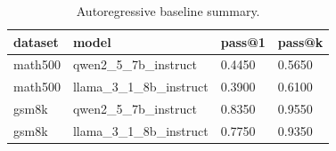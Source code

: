 \begin{table}[t]
\centering
\caption{Autoregressive baseline summary.}
\label{tab:ar-baselines}
\begin{tabular}{llll}
\hline
dataset & model & pass@1 & pass@k \\
\hline
math500 & qwen2_5_7b_instruct & 0.4450 & 0.5650 \\
math500 & llama_3_1_8b_instruct & 0.3900 & 0.6100 \\
gsm8k & qwen2_5_7b_instruct & 0.8350 & 0.9550 \\
gsm8k & llama_3_1_8b_instruct & 0.7750 & 0.9350 \\
\hline
\end{tabular}
\end{table}

